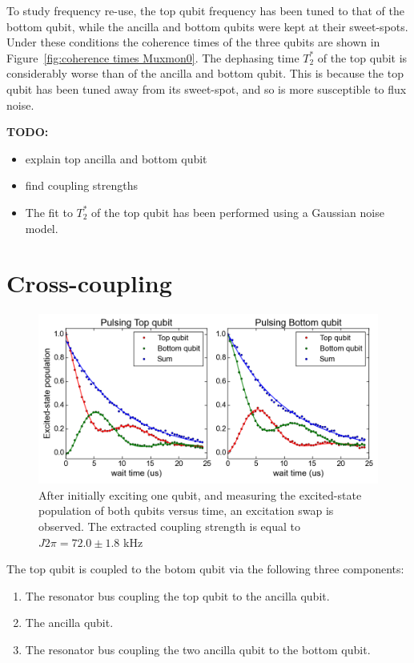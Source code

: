       To study frequency re-use, the top qubit frequency has been tuned to that of the bottom qubit, while the ancilla and bottom qubits were kept at their sweet-spots. Under these conditions the coherence times of the three qubits are shown in Figure~\ref{fig:coherence times Muxmon0}. The dephasing time $T_2^*$ of the top qubit is considerably worse than of the ancilla and bottom qubit. This is because the top qubit has been tuned away from its sweet-spot, and so is more susceptible to flux noise.

      \textbf{TODO:}
      \begin{itemize}
        \item explain top ancilla and bottom qubit
        \item find coupling strengths
        \item  The fit to $T_2^*$ of the top qubit has been performed using a Gaussian noise model.
      \end{itemize}

    \section{Cross-coupling}

      \begin{figure}[tb]
        \centering
        \includegraphics[width=\linewidth]{../Figures/Exploring frequency re-use/excitation_swap.png}
        \caption{After initially exciting one qubit, and measuring the excited-state population of both qubits versus time, an excitation swap is observed. The extracted coupling strength is equal to $J2\pi=72.0 \pm 1.8$ kHz}
        \label{fig:excitation swap}
      \end{figure}

      The top qubit is coupled to the botom qubit via the following three components:

      \begin{enumerate}
        \item The resonator bus coupling the top qubit to the ancilla qubit.
        \item The ancilla qubit.
        \item The resonator bus coupling the two ancilla qubit to the bottom qubit.
      \end{enumerate}


